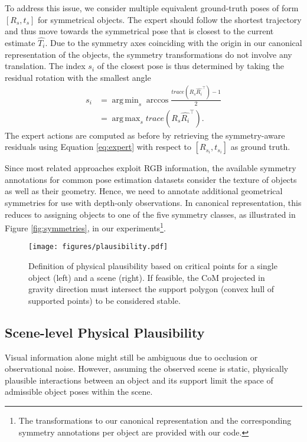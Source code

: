 \documentclass[10pt,twocolumn,letterpaper]{article}
\DeclareMathOperator*{\argmin}{arg\,min}
\DeclareMathOperator*{\argmax}{arg\,max}
\begin{document}
To address this issue, we consider multiple equivalent ground-truth poses of form $[R_s, t_s]$ for symmetrical objects. The expert should follow the shortest trajectory and thus move towards the symmetrical pose that is closest to the current estimate $\hat{T_i}$. Due to the symmetry axes coinciding with the origin in our canonical representation of the objects, the symmetry transformations do not involve any translation. The index $s_i$ of the closest pose is thus determined by taking the residual rotation with the smallest angle
\begin{equation}
\begin{split}
    s_i &= \argmin_{s} \arccos \frac{trace(R_s \hat{R_i}^\top) - 1}{2} \\
        &= \argmax_{s} trace(R_s \hat{R_i}^\top).
\end{split}
\end{equation}
The expert actions are computed as before by retrieving the symmetry-aware residuals using Equation \eqref{eq:expert} with respect to $[R_{s_i}, t_{s_i}]$ as ground truth.

Since most related approaches exploit RGB information, the available symmetry annotations for common pose estimation datasets \cite{hodan2020bop} consider the texture of objects as well as their geometry. Hence, we need to annotate additional geometrical symmetries for use with depth-only observations. In canonical representation, this reduces to assigning objects to one of the five symmetry classes, as illustrated in Figure \ref{fig:symmetries}, in our experiments\footnote{The transformations to our canonical representation and the corresponding symmetry annotations per object are provided with our code.}.

\begin{figure*}
    \centering
    \texttt{[image: figures/plausibility.pdf]}
    \caption{Definition of physical plausibility based on critical points for a single object (left) and a scene (right). If feasible, the CoM projected in gravity direction must intersect the support polygon (convex hull of supported points) to be considered stable.}
    \label{fig:plausibility}
\end{figure*}

\subsection{Scene-level Physical Plausibility}\label{sec:plausibility}
Visual information alone might still be ambiguous due to occlusion or observational noise. However, assuming the observed scene is static, physically plausible interactions between an object and its support limit the space of admissible object poses within the scene.
\end{document}

